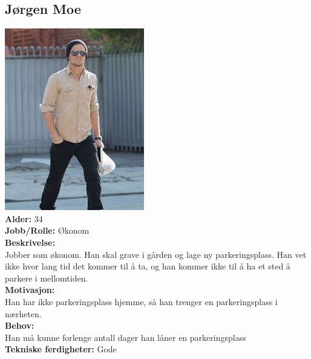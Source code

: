\documentclass[12pt]{article}
\begin{document}
    \subsection{Jørgen Moe}
    \includegraphics[scale=1]{bilder/personaer/persona_jorgen.jpg}\\
    \textbf{Alder:} 34\\
    \textbf{Jobb/Rolle:}
    Økonom\\
    \textbf{Beskrivelse:}\\
    Jobber som økonom. Han skal grave i gården og lage ny parkeringsplass. Han vet ikke hvor lang tid det kommer til å ta, og han kommer ikke til å ha et sted å parkere i mellomtiden.\\
    \textbf{Motivasjon:}\\
    Han har ikke parkeringsplass hjemme, så han trenger en parkeringsplass i nærheten.\\
    \textbf{Behov:}\\
    Han må kunne forlenge antall dager han låner en parkeringsplass\\
    \textbf{Tekniske ferdigheter:} Gode
    
\end{document}
